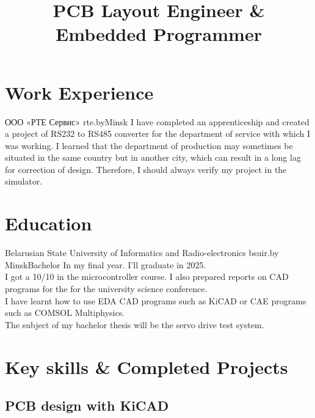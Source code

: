 \documentclass[a4paper,sans]{moderncv}
\title{PCB Layout Engineer \&\\ Embedded Programmer}
\begin{document}
\maketitle

\section{Work Experience}
{ООО «РТЕ Сервис» rte.by}{Minsk}{}{
  I have completed an apprenticeship and created a project of RS232 to
  RS485 converter for the department of service with which I was
  working. I learned that the department of production may sometimes be
  situated in the same country but in another city, which can result in
  a long lag for correction of design. Therefore, I should always verify
  my project in the simulator.}

\section{Education}
{Belarusian State University of Informatics and Radio-electronics bsuir.by}
{Minsk}{Bachelor}{ In my final year. I'll graduate in 2025.\\
  I got a 10/10 in the microcontroller course.
  I also prepared reports on CAD programs for the
  for the university science conference.\\
  I have learnt how to use EDA CAD programs such as KiCAD or CAE programs such as COMSOL
  Multiphysics.\\
  The subject of my bachelor thesis will be the servo drive test system.}

\section{Key skills \& Completed Projects}
\subsection{PCB design with KiCAD}


\end{document}
